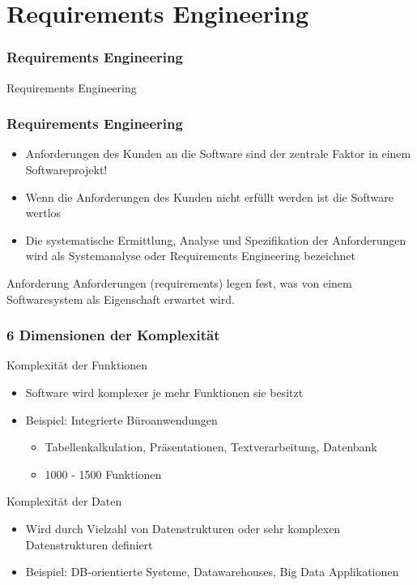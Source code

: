 
\section{Requirements Engineering}
\begin{frame}[fragile]
	\frametitle{Requirements Engineering}
\huge Requirements Engineering
\end{frame}

\begin{frame}
\frametitle{Requirements Engineering}
	\begin{itemize}
		\item Anforderungen des Kunden an die Software sind der zentrale Faktor in einem Softwareprojekt!
		\item Wenn die Anforderungen des Kunden nicht erfüllt werden ist die Software wertlos
		\item Die systematische Ermittlung, Analyse und Spezifikation der Anforderungen wird als Systemanalyse
					oder Requirements Engineering bezeichnet
	\end{itemize}
	\begin{block}{Anforderung}
		Anforderungen (requirements) legen fest, was von einem Softwaresystem als Eigenschaft erwartet wird.
  \end{block}
\end{frame}

\begin{frame}
\frametitle{6 Dimensionen der Komplexität}
	Komplexität der Funktionen
	\begin{itemize}
		\item Software wird komplexer je mehr Funktionen sie besitzt
		\item Beispiel: Integrierte Büroanwendungen
		\begin{itemize}
			\item Tabellenkalkulation, Präsentationen, Textverarbeitung, Datenbank
			\item 1000 - 1500 Funktionen
		\end{itemize}
	\end{itemize}
	\bigskip
	Komplexität der Daten
	\begin{itemize}
		\item Wird durch Vielzahl von Datenstrukturen oder sehr komplexen Datenstrukturen definiert
		\item Beispiel: DB-orientierte Systeme, Datawarehouses, Big Data Applikationen
	\end{itemize}
\end{frame}

